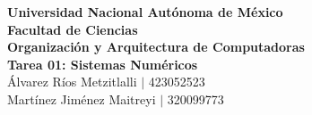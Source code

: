 \documentclass{article}
\begin{document}
\setlength{\parindent}{0cm}

    \begin{center}
        \begin{minipage}{10cm}
    	    \begin{center}
    	        \textbf{\large Universidad Nacional Autónoma de México}\\[0.1cm]
                \textbf{Facultad de Ciencias}\\[0.1cm]
                \textbf{Organización y Arquitectura de Computadoras}\\[0.1cm]
                \textbf{Tarea 01: Sistemas Numéricos}\\[0.1cm]
                \small 
                Álvarez Ríos Metzitlalli $|$ 423052523\\[0.1cm]
                Martínez Jiménez Maitreyi $|$ 320099773\\[0.1cm]
    	    \end{center}
        \end{minipage}\hfill
    \end{center} 
\normalsize
\end{document}
